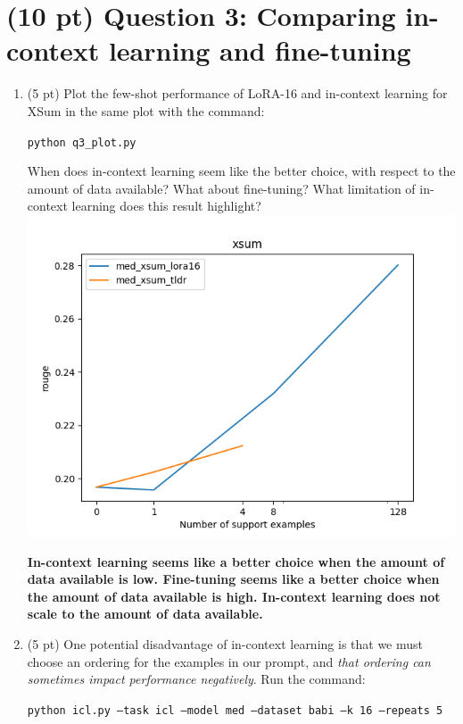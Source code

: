 \documentclass[12pt]{article}
\begin{document}
    \section*{(10 pt) Question 3: Comparing in-context learning and fine-tuning}

    \begin{enumerate}
        \item (5 pt) Plot the few-shot performance of LoRA-16 and in-context learning for XSum in the same plot with the command:

            {\small\texttt{python q3\_plot.py}}

        When does in-context learning seem like the better choice, with respect to the amount of data available? What about fine-tuning? What limitation of in-context learning does this result highlight?\\
        \includegraphics[width=\linewidth]{hw3_starter_code/starter_code/Q3_1.png}

        \textbf{\color{red}In-context learning seems like a better choice when the amount of data available is low. Fine-tuning seems like a better choice when the amount of data available is high. In-context learning does not scale to the amount of data available.}

        \item (5 pt) One potential disadvantage of in-context learning is that we must choose an ordering for the examples in our prompt, and \textit{that ordering can sometimes impact performance negatively}. Run the command:

            {\small \texttt{python icl.py --task icl --model med --dataset babi --k 16 --repeats 5}}


\end{enumerate}
\end{document}
